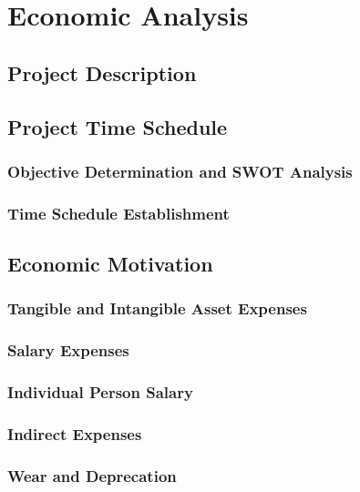 \section{Economic Analysis}

\subsection{Project Description}

\subsection{Project Time Schedule}

\subsubsection{Objective Determination and SWOT Analysis}

\subsubsection{Time Schedule Establishment}

\subsection{Economic Motivation}

\subsubsection{Tangible and Intangible Asset Expenses}

\subsubsection{Salary Expenses}

\subsubsection{Individual Person Salary}

\subsubsection{Indirect Expenses}

\subsubsection{Wear and Deprecation}

